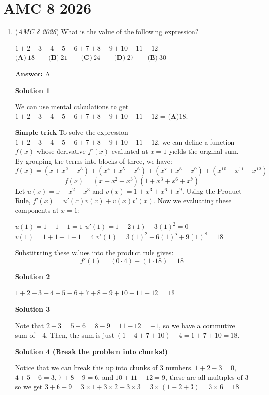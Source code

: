 \section{AMC 8 2026}
        \begin{enumerate}
        	\item (\textit{AMC 8 2026}) What is the value of the following expression?


 $1 + 2 - 3 + 4 + 5 - 6 + 7 + 8 - 9 + 10 + 11 - 12$
$\textbf{(A)}\ 18 \qquad \textbf{(B)}\ 21 \qquad \textbf{(C)}\ 24 \qquad \textbf{(D)}\ 27 \qquad \textbf{(E)}\ 30$

 \textbf{Answer: }A



\textbf{Solution 1}

We can use mental calculations to get $1+2-3+4+5-6+7+8-9+10+11-12$ = $\boxed{\textbf{(A)}18}$.

 \textbf{Simple trick} To solve the expression $1 + 2 - 3 + 4 + 5 - 6 + 7 + 8 - 9 + 10 + 11 - 12$, we can define a function $f(x)$ whose derivative $f'(x)$ evaluated at $x=1$ yields the original sum. By grouping the terms into blocks of three, we have:
 \[f(x) = (x + x^2 - x^3) + (x^4 + x^5 - x^6) + (x^7 + x^8 - x^9) + (x^{10} + x^{11} - x^{12})\]
 \[f(x) = (x + x^2 - x^3)(1 + x^3 + x^6 + x^9)\]Let $u(x) = x + x^2 - x^3$ and $v(x) = 1 + x^3 + x^6 + x^9$. Using the Product Rule, $f'(x) = u'(x)v(x) + u(x)v'(x)$. Now we evaluating these components at $x=1$:

 $u(1) = 1 + 1 - 1 = 1$
$u'(1) = 1 + 2(1) - 3(1)^2 = 0$
$v(1) = 1 + 1 + 1 + 1 = 4$
$v'(1) = 3(1)^2 + 6(1)^5 + 9(1)^8 = 18$

 Substituting these values into the product rule gives:
 \[f'(1) = (0 \cdot 4) + (1 \cdot 18) = \boxed{18}\]




\textbf{Solution 2}

$1+2-3+4+5-6+7+8-9+10+11-12$ = $\boxed{18}$




\textbf{Solution 3}

Note that $2-3 = 5-6 = 8-9 = 11-12 = -1$, so we have a commutive sum of $-4$. Then, the sum is just $(1+4+7+10)-4 = 1+7+10 = \boxed{18}$.

 



\textbf{Solution 4 (Break the problem into chunks!)}

Notice that we can break this up into chunks of 3 numbers. $1+2-3=0$, $4+5-6=3$, $7+8-9=6$, and $10+11-12=9$, these are all multiples of 3 so we get $3+6+9=3 \times 1 + 3\times2+3\times3= 3\times(1+2+3) = 3 \times 6 =\boxed{18}$





\end{enumerate}
